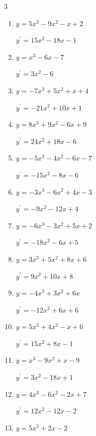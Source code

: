 \begin{multicols}{3}
\begin{enumerate}
  \itemsep=10pt
  \item $y=5x^{3}-9x^{2}-x+2$

        $\displaystyle y^{\prime}=15x^{2}-18x-1$

  \item $y=x^{3}-6x-7$

        $\displaystyle y^{\prime}=3x^{2}-6$

  \item $y=-7x^{3}+5x^{2}+x+4$

        $\displaystyle y^{\prime}=-21x^{2}+10x+1$

  \item $y=8x^{3}+9x^{2}-6x+9$

        $\displaystyle y^{\prime}=24x^{2}+18x-6$

  \item $y=-5x^{3}-4x^{2}-6x-7$

        $\displaystyle y^{\prime}=-15x^{2}-8x-6$

  \item $y=-3x^{3}-6x^{2}+4x-3$

        $\displaystyle y^{\prime}=-9x^{2}-12x+4$

  \item $y=-6x^{3}-3x^{2}+5x+2$

        $\displaystyle y^{\prime}=-18x^{2}-6x+5$

  \item $y=3x^{3}+5x^{2}+8x+6$

        $\displaystyle y^{\prime}=9x^{2}+10x+8$

  \item $y=-4x^{3}+3x^{2}+6x$

        $\displaystyle y^{\prime}=-12x^{2}+6x+6$

  \item $y=5x^{3}+4x^{2}-x+6$

        $\displaystyle y^{\prime}=15x^{2}+8x-1$

  \item $y=x^{3}-9x^{2}+x-9$

        $\displaystyle y^{\prime}=3x^{2}-18x+1$

  \item $y=4x^{3}-6x^{2}-2x+7$

        $\displaystyle y^{\prime}=12x^{2}-12x-2$

  \item $y=5x^{3}+2x-2$


\end{enumerate}
\end{multicols}
